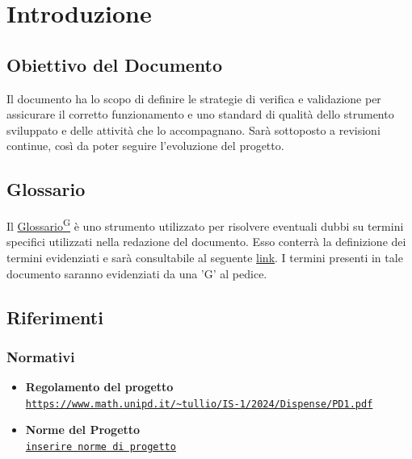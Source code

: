 \documentclass{article}
\begin{document}
\tableofcontents
\listoftables
\listoffigures



\newpage
\section{Introduzione}
\subsection{Obiettivo del Documento}
Il documento ha lo scopo di definire le strategie di verifica e validazione per assicurare il corretto funzionamento e uno standard di qualità
dello strumento sviluppato e delle attività che lo accompagnano. Sarà sottoposto a revisioni continue, così da poter seguire l'evoluzione del progetto.

\subsection{Glossario}
Il \href{https://code7crusaders.github.io/docs/RTB/documentazione_interna/glossario.html#glossario}{Glossario\textsuperscript{G}} è uno strumento utilizzato per risolvere eventuali dubbi su termini specifici utilizzati nella redazione del documento. Esso conterrà la definizione dei 
termini evidenziati e sarà consultabile al seguente \href{https://code7crusaders.github.io/docs/RTB/documentazione_interna/glossario.html}{link}. I termini presenti in tale documento
saranno evidenziati da una 'G' al pedice.

\subsection{Riferimenti}
\subsubsection{Normativi}
\begin{itemize}
    \item \textbf{Regolamento del progetto} \\ \texttt{\url{https://www.math.unipd.it/~tullio/IS-1/2024/Dispense/PD1.pdf}}
    \item \textbf{Norme del Progetto} \\ \texttt{\url{inserire norme di progetto}}
\end{itemize}
\end{document}
